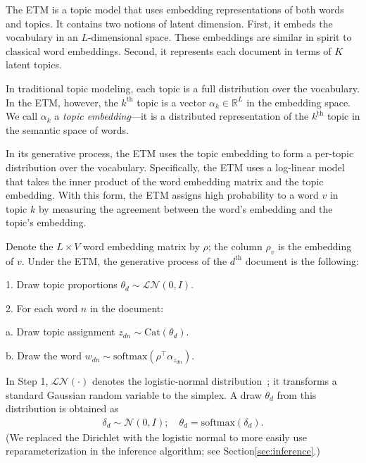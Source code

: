 \documentclass[11pt,a4paper]{article}
\newcommand{\Ncal}{\mathcal{N}}
\begin{document}
The \gls{ETM} is a topic model that uses embedding representations of
both words and topics.  It contains two notions of latent
dimension. First, it embeds the vocabulary in an $L$-dimensional
space.  These embeddings are similar in spirit to classical word
embeddings.  Second, it represents each document in terms of $K$
latent topics.

In traditional topic modeling, each topic is a full distribution over
the vocabulary. In the \gls{ETM}, however, the $k^{\textrm{th}}$ topic is a vector
$\alpha_k\in\mathbb{R}^L$ in the embedding space. We call $\alpha_k$ a
\emph{topic embedding}---it is a distributed representation of the
$k^{\textrm{th}}$ topic in the semantic space of words.

In its generative process, the \gls{ETM} uses the topic embedding to
form a per-topic distribution over the vocabulary. Specifically, the
\gls{ETM} uses a log-linear model that takes the inner product of the
word embedding matrix and the topic embedding.  With this form, the
\gls{ETM} assigns high probability to a word $v$ in topic $k$ by
measuring the agreement between the word's embedding and the topic's
embedding.

Denote the $L \times V$ word embedding matrix by $\rho$; the column
$\rho_v$ is the embedding of $v$.  Under the \gls{ETM}, the generative
process of the $d^{\textrm{th}}$ document is the following:
\begin{compactitem}
\item[1.] Draw topic proportions $\theta_d \sim \mathcal{LN}(0,I).$
\item[2.] For each word $n$ in the document:
  \begin{compactitem}
    \setlength{\itemindent}{-0.3cm}
  \item[a.] Draw topic assignment $z_{dn} \sim \text{Cat}(\theta_d).$
  \item[b.] Draw the word $w_{dn} \sim \text{softmax}(\rho^\top\alpha_{z_{dn}})$.
  \end{compactitem}
\end{compactitem}
In Step 1, $\mathcal{LN}(\cdot)$ denotes the logistic-normal
distribution~\citep{Aitchison:1980,blei2007correlated}; it transforms
a standard Gaussian random variable to the simplex. A draw $\theta_d$
from this distribution is obtained as
\begin{align}
  \label{eq:logistic-normal}
  \delta_d \sim \Ncal\left(0,I\right); \quad  \theta_d =
  \text{softmax}(\delta_d).
\end{align}
(We replaced the Dirichlet with the logistic normal to more easily use
reparameterization in the inference algorithm; see
Section\nobreakspace \ref {sec:inference}.)
\end{document}
